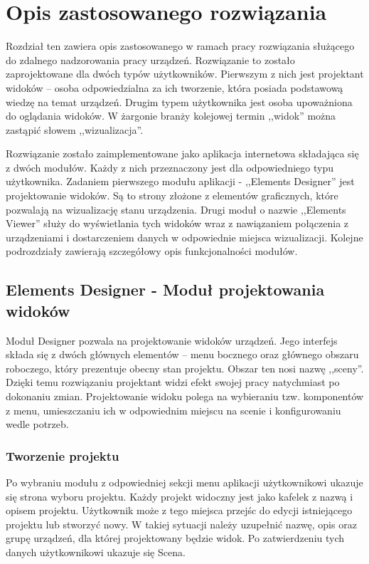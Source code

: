 \chapter{Opis zastosowanego rozwiązania}

Rozdział ten zawiera opis zastosowanego w ramach pracy rozwiązania służącego do zdalnego nadzorowania pracy urządzeń. Rozwiązanie to zostało zaprojektowane dla dwóch typów użytkowników. Pierwszym z nich jest projektant widoków – osoba odpowiedzialna za ich tworzenie, która posiada podstawową wiedzę na temat urządzeń. Drugim typem użytkownika jest osoba upoważniona do oglądania widoków. W żargonie branży kolejowej termin ,,widok'' można zastąpić słowem ,,wizualizacja''.

Rozwiązanie zostało zaimplementowane jako aplikacja internetowa składająca się z dwóch modułów. Każdy z nich przeznaczony jest dla odpowiedniego typu użytkownika. Zadaniem pierwszego modułu aplikacji - ,,Elements Designer'' jest projektowanie widoków. Są to strony złożone z elementów graficznych, które pozwalają na wizualizację stanu urządzenia. Drugi moduł o nazwie ,,Elements Viewer'' służy do wyświetlania tych widoków wraz z nawiązaniem połączenia z urządzeniami i dostarczeniem danych w odpowiednie miejsca wizualizacji. Kolejne podrozdziały zawierają szczegółowy opis funkcjonalności modułów.

\section{Elements Designer - Moduł projektowania widoków}

Moduł Designer pozwala na projektowanie widoków urządzeń. Jego interfejs składa się z dwóch głównych elementów – menu bocznego oraz głównego obszaru roboczego, który prezentuje obecny stan projektu. Obszar ten nosi nazwę ,,sceny''. Dzięki temu rozwiązaniu projektant widzi efekt swojej pracy natychmiast po dokonaniu zmian.
Projektowanie widoku polega na wybieraniu tzw. komponentów z menu, umieszczaniu ich w odpowiednim miejscu na scenie i konfigurowaniu wedle potrzeb.

\subsection{Tworzenie projektu}

Po wybraniu modułu z odpowiedniej sekcji menu aplikacji użytkownikowi ukazuje się strona wyboru projektu. Każdy projekt widoczny jest jako kafelek z nazwą i opisem projektu. Użytkownik może z tego miejsca przejśc do edycji istniejącego projektu lub stworzyć nowy. W takiej sytuacji należy uzupełnić nazwę, opis oraz grupę urządzeń, dla której projektowany będzie widok. Po zatwierdzeniu tych danych użytkownikowi ukazuje się Scena.



